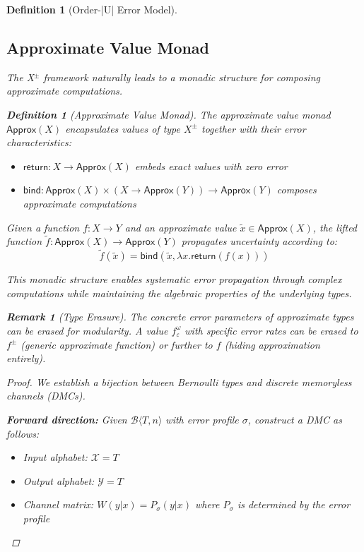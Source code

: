 \documentclass[11pt,final,hidelinks]{article}
\newtheorem{definition}[theorem]{Definition}
\newtheorem{remark}[theorem]{Remark}
\newcommand{\bernoulli}[2]{\mathcal{B}\langle #1, #2 \rangle}
\begin{document}
\begin{definition}[Order-|U| Error Model]
\subsection{Approximate Value Monad}

The X$^{\pm}$ framework naturally leads to a monadic structure for composing approximate computations.

\begin{definition}[Approximate Value Monad]
The approximate value monad $\mathsf{Approx}(X)$ encapsulates values of type $X^{\pm}$ together with their error characteristics:
\begin{itemize}
    \item $\mathsf{return}: X \to \mathsf{Approx}(X)$ embeds exact values with zero error
    \item $\mathsf{bind}: \mathsf{Approx}(X) \times (X \to \mathsf{Approx}(Y)) \to \mathsf{Approx}(Y)$ composes approximate computations
\end{itemize}
\end{definition}

Given a function $f: X \to Y$ and an approximate value $\tilde{x} \in \mathsf{Approx}(X)$, the lifted function $\tilde{f}: \mathsf{Approx}(X) \to \mathsf{Approx}(Y)$ propagates uncertainty according to:
\begin{equation}
\tilde{f}(\tilde{x}) = \mathsf{bind}(\tilde{x}, \lambda x. \mathsf{return}(f(x)))
\end{equation}

This monadic structure enables systematic error propagation through complex computations while maintaining the algebraic properties of the underlying types.

\begin{remark}[Type Erasure]
The concrete error parameters of approximate types can be erased for modularity. A value $f^{\omega}_{\varepsilon}$ with specific error rates can be erased to $f^{\pm}$ (generic approximate function) or further to $f$ (hiding approximation entirely).
\end{remark}

\begin{proof}
We establish a bijection between Bernoulli types and discrete memoryless channels (DMCs).

\textbf{Forward direction:} Given $\bernoulli{T}{n}$ with error profile $\sigma$, construct a DMC as follows:
\begin{itemize}
    \item Input alphabet: $\mathcal{X} = T$
    \item Output alphabet: $\mathcal{Y} = T$
    \item Channel matrix: $W(y|x) = P_\sigma(y|x)$ where $P_\sigma$ is determined by the error profile
\end{itemize}


\end{proof}
\end{definition}
\end{document}
